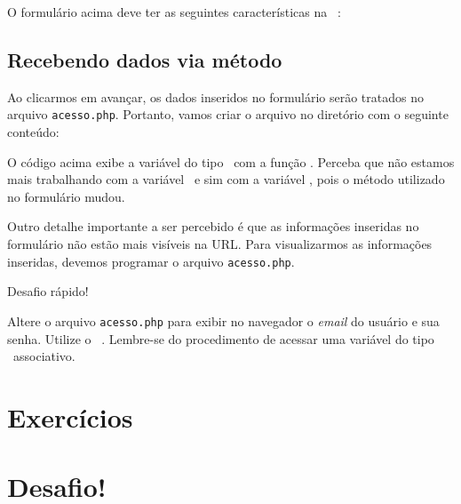 O formulário acima deve ter as seguintes características na \tag~\tagform:



\subsection{Recebendo dados via método \metodoPOST}
\label{recebendo-dados-via-metodo-post}

Ao clicarmos em avançar, os dados inseridos no formulário serão tratados no arquivo
\texttt{acesso.php}. Portanto, vamos criar o arquivo no diretório 
com o seguinte conteúdo:



O código acima exibe a variável do tipo \tipoarray~com a função \funcaoprintr.
Perceba que não estamos mais trabalhando com a variável \variavelget~e sim com a
variável \variavelpost, pois o método utilizado no formulário mudou.

Outro detalhe importante a ser percebido é que as informações inseridas no
formulário não estão mais visíveis na URL. Para visualizarmos as informações
inseridas, devemos programar o arquivo \texttt{acesso.php}.

\begin{framed}
{\Large Desafio rápido!}

Altere o arquivo \texttt{acesso.php} para exibir no navegador o \textit{email} do usuário
e sua senha. Utilize o \tipoarray~\variavelpost. Lembre-se do procedimento de acessar uma 
variável do tipo \tipoarray~associativo.
\end{framed}


\section{Exercícios}
\label{cap7-exercicios}

\section{Desafio!}
\label{cap7-desafio}